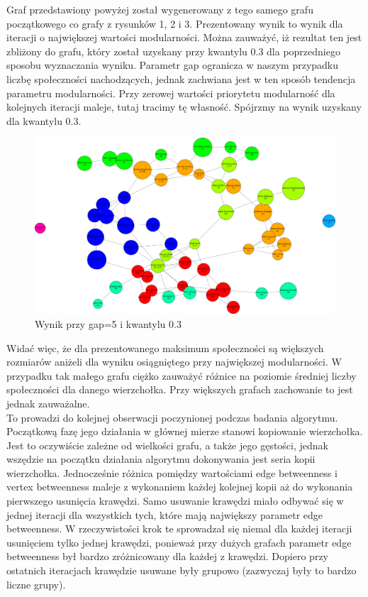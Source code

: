 \documentclass{article}
\begin{document}
Graf przedstawiony powyżej został wygenerowany z tego samego grafu początkowego co grafy z rysunków 1, 2 i 3. Prezentowany wynik to wynik dla iteracji o największej wartości modularności. Można zauważyć, iż rezultat ten jest zbliżony do grafu, który został uzyskany przy kwantylu 0.3 dla poprzedniego sposobu wyznaczania wyniku. Parametr gap ogranicza w naszym przypadku liczbę społeczności nachodzących, jednak zachwiana jest w ten sposób tendencja parametru modularności. Przy zerowej wartości priorytetu modularność dla kolejnych iteracji maleje, tutaj tracimy tę własność. Spójrzmy na wynik uzyskany dla kwantylu 0.3.

\begin{figure}[H]
\centering
\includegraphics[width=\textwidth]{images/is-sample-5.png}
\caption{Wynik przy gap=5 i kwantylu 0.3}
\end{figure}

Widać więc, że dla prezentowanego maksimum społeczności są większych rozmiarów aniżeli dla wyniku osiągniętego przy największej modularności. W przypadku tak małego grafu ciężko zauważyć różnice na poziomie średniej liczby społeczności dla danego wierzchołka. Przy większych grafach zachowanie to jest jednak zauważalne. \\

To prowadzi do kolejnej obserwacji poczynionej podczas badania algorytmu. Początkową fazę jego działania w głównej mierze stanowi kopiowanie wierzchołka. Jest to oczywiście zależne od wielkości grafu, a także jego gęstości, jednak wszędzie na początku działania algorytmu dokonywania jest seria kopii wierzchołka. Jednocześnie różnica pomiędzy wartościami edge betweenness i vertex betweenness maleje z wykonaniem każdej kolejnej kopii aż do wykonania pierwszego usunięcia krawędzi. Samo usuwanie krawędzi miało odbywać się w jednej iteracji dla wszystkich tych, które mają największy parametr edge betweenness. W rzeczywistości krok te sprowadzał się niemal dla każdej iteracji usunięciem tylko jednej krawędzi, ponieważ przy dużych grafach parametr edge betweenness był bardzo zróżnicowany dla każdej z krawędzi. Dopiero przy ostatnich iteracjach krawędzie usuwane były grupowo (zazwyczaj były to bardzo liczne grupy). \\
\end{document}

